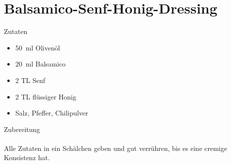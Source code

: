 \section*{Balsamico-Senf-Honig-Dressing}
\ihead{}\ohead{}
\cfoot{}
{\Large Zutaten}
\begin{multicols}{2}
\begin{itemize}
    \item \SI{50}{ml} Olivenöl
    \item \SI{20}{ml} Balsamico
    \item \num{2} TL Senf
    \item \num{2} TL flüssiger Honig
    \item Salz, Pfeffer, Chilipulver
\end{itemize}
\end{multicols}
\noindent
{\Large Zubereitung}\\
\\
Alle Zutaten in ein Schälchen geben und gut verrühren, bis es eine cremige Konsistenz hat.